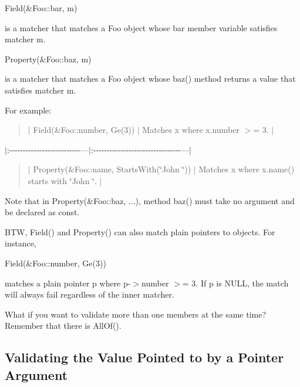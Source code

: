 \begin{DoxyCode}
Field(&Foo::bar, m)
\end{DoxyCode}


is a matcher that matches a {\ttfamily Foo} object whose {\ttfamily bar} member variable satisfies matcher {\ttfamily m}.


\begin{DoxyCode}
Property(&Foo::baz, m)
\end{DoxyCode}


is a matcher that matches a {\ttfamily Foo} object whose {\ttfamily baz()} method returns a value that satisfies matcher {\ttfamily m}.

For example\+:

\begin{quote}
$\vert$ {\ttfamily Field(\&\+Foo\+::number, Ge(3))} $\vert$ Matches {\ttfamily x} where {\ttfamily x.\+number $>$= 3}. $\vert$ \end{quote}
$\vert$\+:-\/-\/-\/-\/-\/-\/-\/-\/-\/-\/-\/-\/-\/-\/-\/-\/-\/-\/-\/-\/-\/-\/-\/-\/-\/-\/---$\vert$\+:-\/-\/-\/-\/-\/-\/-\/-\/-\/-\/-\/-\/-\/-\/-\/-\/-\/-\/-\/-\/-\/-\/-\/-\/-\/-\/-\/-\/-\/-\/-\/-\/---$\vert$ \begin{quote}
$\vert$ {\ttfamily Property(\&Foo\+::name, Starts\+With(\char`\"{}\+John \char`\"{}))} $\vert$ Matches {\ttfamily x} where {\ttfamily x.\+name()} starts with {\ttfamily \char`\"{}\+John \char`\"{}}. $\vert$ \end{quote}


Note that in {\ttfamily Property(\&Foo\+::baz, ...)}, method {\ttfamily baz()} must take no argument and be declared as {\ttfamily const}.

B\+TW, {\ttfamily Field()} and {\ttfamily Property()} can also match plain pointers to objects. For instance,


\begin{DoxyCode}
Field(&Foo::number, Ge(3))
\end{DoxyCode}


matches a plain pointer {\ttfamily p} where {\ttfamily p-\/$>$number $>$= 3}. If {\ttfamily p} is {\ttfamily N\+U\+LL}, the match will always fail regardless of the inner matcher.

What if you want to validate more than one members at the same time? Remember that there is {\ttfamily All\+Of()}.

\subsection*{Validating the Value Pointed to by a Pointer Argument}


